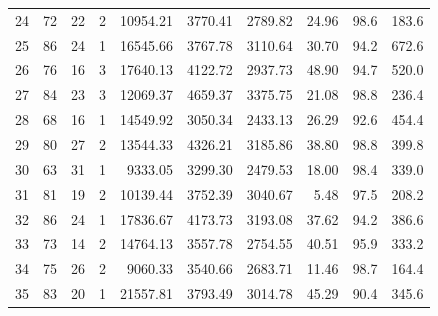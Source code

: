 \begin{longtable}{rrrrrrrrrr}
24 & 72 & 22 & 2 & 10954.21 & 3770.41 & 2789.82 & 24.96 & 98.6 & 183.6 \\
25 & 86 & 24 & 1 & 16545.66 & 3767.78 & 3110.64 & 30.70 & 94.2 & 672.6 \\
26 & 76 & 16 & 3 & 17640.13 & 4122.72 & 2937.73 & 48.90 & 94.7 & 520.0 \\
27 & 84 & 23 & 3 & 12069.37 & 4659.37 & 3375.75 & 21.08 & 98.8 & 236.4 \\
28 & 68 & 16 & 1 & 14549.92 & 3050.34 & 2433.13 & 26.29 & 92.6 & 454.4 \\
29 & 80 & 27 & 2 & 13544.33 & 4326.21 & 3185.86 & 38.80 & 98.8 & 399.8 \\
30 & 63 & 31 & 1 & 9333.05 & 3299.30 & 2479.53 & 18.00 & 98.4 & 339.0 \\
31 & 81 & 19 & 2 & 10139.44 & 3752.39 & 3040.67 & 5.48 & 97.5 & 208.2 \\
32 & 86 & 24 & 1 & 17836.67 & 4173.73 & 3193.08 & 37.62 & 94.2 & 386.6 \\
33 & 73 & 14 & 2 & 14764.13 & 3557.78 & 2754.55 & 40.51 & 95.9 & 333.2 \\
34 & 75 & 26 & 2 & 9060.33 & 3540.66 & 2683.71 & 11.46 & 98.7 & 164.4 \\
35 & 83 & 20 & 1 & 21557.81 & 3793.49 & 3014.78 & 45.29 & 90.4 & 345.6 \\

\end{longtable}

\endgroup
